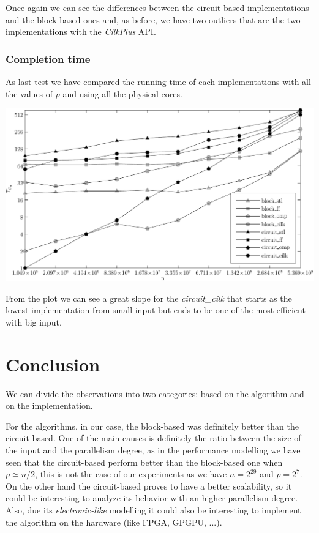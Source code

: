 \documentclass{article}
\begin{document}
Once again we can see the differences between the circuit-based implementations and the block-based ones and, as before, we have two outliers that are the two implementations with the \textit{CilkPlus} API.

\subsubsection{Completion time}

As last test we have compared the running time of each implementations with all the values of $p$ and using all the physical cores.

\begin{center}
\begin{minipage}{0.75\linewidth}
\includegraphics[width=\linewidth]{img/completion}
\end{minipage}
\end{center}

From the plot we can see a great slope for the \textit{circuit\_cilk} that starts as the lowest implementation from small input but ends to be one of the most efficient with big input.

\section{Conclusion}

We can divide the observations into two categories: based on the algorithm and on the implementation.

\medskip

For the algorithms, in our case, the block-based was definitely better than the circuit-based. One of the main causes is definitely the ratio between the size of the input and the parallelism degree, as in the performance modelling we have seen that the circuit-based perform better than the block-based one when $p \simeq n/2$, this is not the case of our experiments as we have $n = 2^{29}$ and $p = 2^{7}$. On the other hand the circuit-based proves to have a better scalability, so it could be interesting to analyze its behavior with an higher parallelism degree. Also, due its \textit{electronic-like} modelling it could also be interesting to implement the algorithm on the hardware (like FPGA, GPGPU, ...).
\end{document}
